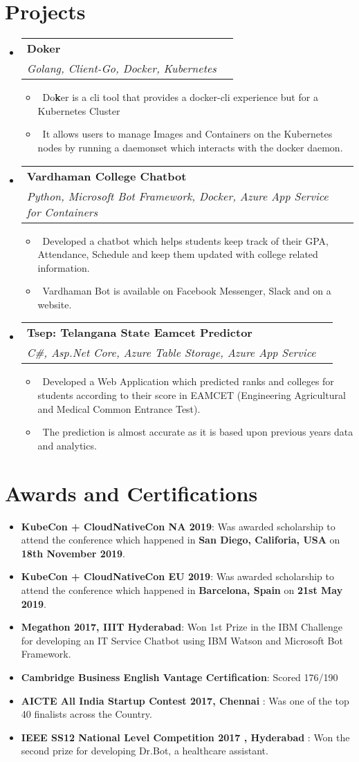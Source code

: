 \documentclass[letterpaper,11pt]{article}
\makeatletter
\newcommand{\resumeItem}[2]{
  \item\small{
    \textbf{#1}{: #2 \vspace{-2pt}}
  }
}
\newcommand{\resumeMyItem}[1]{
  \item\small{
    \ #1 \vspace{-2pt}
  }
}
\newcommand{\resumeSubheading}[4]{
  \vspace{-1pt}\item
    \begin{tabular*}{0.97\textwidth}{l@{\extracolsep{\fill}}r}
      \textbf{#1} & #2 \\
      \textit{\small#3} & \textit{\small #4} \\
    \end{tabular*}\vspace{-5pt}
}
\newcommand{\resumeSubItem}[2]{\resumeItem{#1}{#2}\vspace{-4pt}}
\newcommand{\resumeSubHeadingListStart}{\begin{itemize}[leftmargin=*]}
\newcommand{\resumeSubHeadingListEnd}{\end{itemize}}
\newcommand{\resumeItemListStart}{\begin{itemize}}
\newcommand{\resumeItemListEnd}{\end{itemize}\vspace{-5pt}}
\makeatother
\begin{document}
\section{Projects}
  \resumeSubHeadingListStart

  \resumeSubheading
  {Doker}{}
  {Golang, Client-Go, Docker, Kubernetes}{}
  \resumeItemListStart
    \resumeMyItem{Do\textbf{k}er is a cli tool that provides a docker-cli experience but for a Kubernetes Cluster}
    \resumeMyItem{It allows users to manage Images and Containers on the Kubernetes nodes by running a daemonset which interacts with the docker daemon.}
  \resumeItemListEnd

  \resumeSubheading
  {Vardhaman College Chatbot}{}
  {Python, Microsoft Bot Framework, Docker, Azure App Service for Containers}{}
  \resumeItemListStart
    \resumeMyItem{Developed a chatbot which helps students keep track of their GPA, Attendance, Schedule and keep them updated with college related information.}
    \resumeMyItem{Vardhaman Bot is available on Facebook Messenger, Slack and on a website.}
  \resumeItemListEnd

    \resumeSubheading
      {Tsep: Telangana State Eamcet Predictor}{}
      {C\#, Asp.Net Core, Azure Table Storage, Azure App Service}{}
      \resumeItemListStart
        \resumeMyItem{Developed a Web Application which predicted ranks and colleges for students according to their score in EAMCET (Engineering Agricultural and Medical Common Entrance Test).}
        \resumeMyItem{The prediction is almost accurate as it is based upon previous years data and analytics.}
      \resumeItemListEnd
    \resumeSubHeadingListEnd
\section{Awards and Certifications}
  \resumeSubHeadingListStart
  \resumeSubItem{KubeCon + CloudNativeCon NA 2019}{Was awarded scholarship to attend the conference which happened in \textbf{San Diego, Califoria, USA} on \textbf{18th November 2019}.}
    \resumeSubItem{KubeCon + CloudNativeCon EU 2019}{Was awarded scholarship to attend the conference which happened in \textbf{Barcelona, Spain} on \textbf{21st May 2019}.}
    \resumeSubItem{Megathon 2017, IIIT Hyderabad}
      {Won 1st Prize in the IBM Challenge for developing an IT Service Chatbot using IBM Watson and Microsoft Bot Framework.}
      \resumeSubItem{Cambridge Business English Vantage Certification}
      {Scored  176/190 }
      \resumeSubItem{AICTE All India Startup Contest 2017, Chennai }
      {Was one of the top 40 finalists across the Country.}
      \resumeSubItem{IEEE SS12 National Level Competition 2017 , Hyderabad }
      {Won the second prize for developing Dr.Bot, a healthcare assistant.}
  \resumeSubHeadingListEnd
\end{document}
